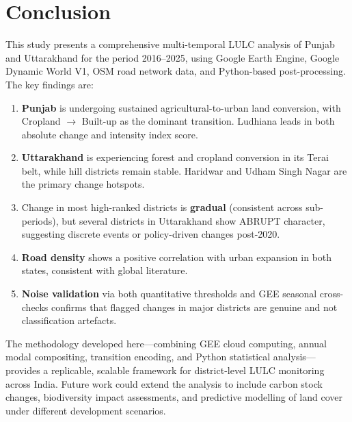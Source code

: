 \documentclass[12pt,a4paper]{article}
\begin{document}
\section{Conclusion}

This study presents a comprehensive multi-temporal LULC analysis of Punjab and Uttarakhand for the period 2016--2025, using Google Earth Engine, Google Dynamic World V1, OSM road network data, and Python-based post-processing. The key findings are:

\begin{enumerate}
    \item \textbf{Punjab} is undergoing sustained agricultural-to-urban land conversion, with Cropland $\to$ Built-up as the dominant transition. Ludhiana leads in both absolute change and intensity index score.
    \item \textbf{Uttarakhand} is experiencing forest and cropland conversion in its Terai belt, while hill districts remain stable. Haridwar and Udham Singh Nagar are the primary change hotspots.
    \item Change in most high-ranked districts is \textbf{gradual} (consistent across sub-periods), but several districts in Uttarakhand show ABRUPT character, suggesting discrete events or policy-driven changes post-2020.
    \item \textbf{Road density} shows a positive correlation with urban expansion in both states, consistent with global literature.
    \item \textbf{Noise validation} via both quantitative thresholds and GEE seasonal cross-checks confirms that flagged changes in major districts are genuine and not classification artefacts.
\end{enumerate}

The methodology developed here---combining GEE cloud computing, annual modal compositing, transition encoding, and Python statistical analysis---provides a replicable, scalable framework for district-level LULC monitoring across India. Future work could extend the analysis to include carbon stock changes, biodiversity impact assessments, and predictive modelling of land cover under different development scenarios.
\end{document}

